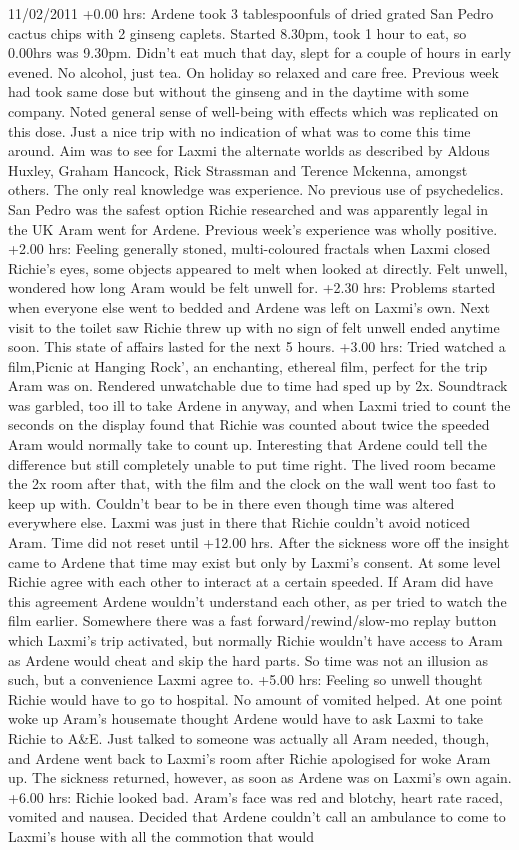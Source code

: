 \documentclass[12pt]{book}
\begin{document}
11/02/2011 +0.00 hrs: Ardene took 3 tablespoonfuls of dried grated San Pedro cactus chips with 2 ginseng caplets. Started 8.30pm, took 1 hour to eat, so 0.00hrs was 9.30pm. Didn't eat much that day, slept for a couple of hours in early evened. No alcohol, just tea. On holiday so relaxed and care free. Previous week had took same dose but without the ginseng and in the daytime with some company. Noted general sense of well-being with effects which was replicated on this dose. Just a nice trip with no indication of what was to come this time around. Aim was to see for Laxmi the alternate worlds as described by Aldous Huxley, Graham Hancock, Rick Strassman and Terence Mckenna, amongst others. The only real knowledge was experience. No previous use of psychedelics. San Pedro was the safest option Richie researched and was apparently legal in the UK Aram went for Ardene. Previous week's experience was wholly positive. +2.00 hrs: Feeling generally stoned, multi-coloured fractals when Laxmi closed Richie's eyes, some objects appeared to melt when looked at directly. Felt unwell, wondered how long Aram would be felt unwell for. +2.30 hrs: Problems started when everyone else went to bedded and Ardene was left on Laxmi's own. Next visit to the toilet saw Richie threw up with no sign of felt unwell ended anytime soon. This state of affairs lasted for the next 5 hours. +3.00 hrs: Tried watched a film,Picnic at Hanging Rock', an enchanting, ethereal film, perfect for the trip Aram was on. Rendered unwatchable due to time had sped up by 2x. Soundtrack was garbled, too ill to take Ardene in anyway, and when Laxmi tried to count the seconds on the display found that Richie was counted about twice the speeded Aram would normally take to count up. Interesting that Ardene could tell the difference but still completely unable to put time right. The lived room became the 2x room after that, with the film and the clock on the wall went too fast to keep up with. Couldn't bear to be in there even though time was altered everywhere else. Laxmi was just in there that Richie couldn't avoid noticed Aram. Time did not reset until +12.00 hrs. After the sickness wore off the insight came to Ardene that time may exist but only by Laxmi's consent. At some level Richie agree with each other to interact at a certain speeded. If Aram did have this agreement Ardene wouldn't understand each other, as per tried to watch the film earlier. Somewhere there was a fast forward/rewind/slow-mo replay button which Laxmi's trip activated, but normally Richie wouldn't have access to Aram as Ardene would cheat and skip the hard parts. So time was not an illusion as such, but a convenience Laxmi agree to. +5.00 hrs: Feeling so unwell thought Richie would have to go to hospital. No amount of vomited helped. At one point woke up Aram's housemate thought Ardene would have to ask Laxmi to take Richie to A\&E. Just talked to someone was actually all Aram needed, though, and Ardene went back to Laxmi's room after Richie apologised for woke Aram up. The sickness returned, however, as soon as Ardene was on Laxmi's own again. +6.00 hrs: Richie looked bad. Aram's face was red and blotchy, heart rate raced, vomited and nausea. Decided that Ardene couldn't call an ambulance to come to Laxmi's house with all the commotion that would 
\end{document}
